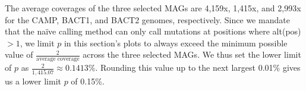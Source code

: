 The average coverages of the three selected MAGs are 4,159x, 1,415x, and 2,993x for the CAMP, BACT1, and BACT2 genomes, respectively. Since we mandate that the na\"ive calling method can only call mutations at positions where alt(pos) $> 1$, we limit $p$ in this section's plots to always exceed the minimum possible value of $\frac{2}{\text{average coverage}}$ across the three selected MAGs. We thus set the lower limit of $p$ as $\frac{2}{1,415.07} \approx 0.1413\%$. Rounding this value up to the next largest 0.01\% gives us a lower limit $p$ of 0.15\%.\endinput